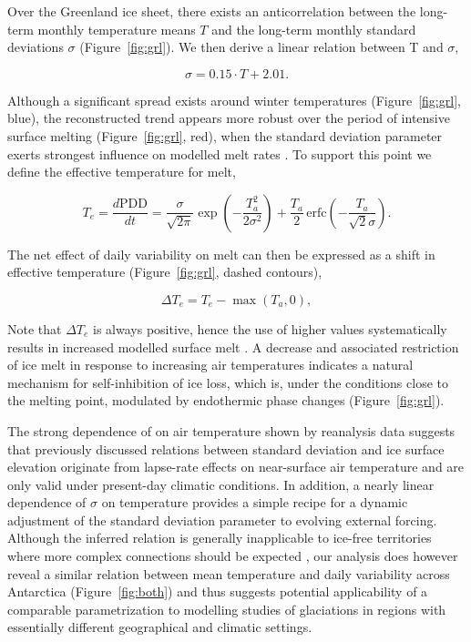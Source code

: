 \documentclass[review]{igs}
\begin{document}
Over the Greenland ice sheet, there exists an anticorrelation between the long-term monthly temperature means $T$ and the long-term monthly standard deviations $\sigma$ (Figure~\ref{fig:grl}). We then derive a linear relation between T and $\sigma$,

\begin{equation} \label{eq:sigma}
    \sigma = 0.15 \cdot T + 2.01.
\end{equation}

Although a significant spread exists around winter temperatures (Figure~\ref{fig:grl}, blue), the reconstructed trend appears more robust over the period of intensive surface melting (Figure~\ref{fig:grl}, red), when the standard deviation parameter exerts strongest influence on modelled melt rates \citep{rogozhina-rau-inpress}. To support this point we define the effective temperature for melt,

\begin{equation} \label{eq:teff}
    T_e = \frac{d\mathrm{PDD}}{dt}
        = \frac{\sigma}{\sqrt{2\pi}} \exp\left({-\frac{T_a^2}{2\sigma^2}}\right)
            + \frac{T_a}{2} \, \mathrm{erfc} \left(-\frac{T_a}{\sqrt{2}\sigma}\right).
\end{equation}

The net effect of daily variability on melt can then be expressed as a shift in effective temperature (Figure~\ref{fig:grl}, dashed contours),

\begin{equation} \label{eq:dteff}
    \Delta T_e = T_e - \max(T_a, 0),
\end{equation}

Note that $\Delta T_e$ is always positive, hence the use of higher values systematically results in increased modelled surface melt \citep{rogozhina-rau-inpress}. A decrease and associated restriction of ice melt in response to increasing air temperatures indicates a natural mechanism for self-inhibition of ice loss, which is, under the conditions close to the melting point, modulated by endothermic phase changes (Figure~\ref{fig:grl}).

The strong dependence of on air temperature shown by reanalysis data suggests that previously discussed relations between standard deviation and ice surface elevation \citep{fausto-etal-2009,fausto-etal-2011} originate from lapse-rate effects on near-surface air temperature and are only valid under present-day climatic conditions. In addition, a nearly linear dependence of $\sigma$ on temperature provides a simple recipe for a dynamic adjustment of the standard deviation parameter to evolving external forcing. Although the inferred relation is generally inapplicable to ice-free territories where more complex connections should be expected \citep{seguinot-2013}, our analysis does however reveal a similar relation between mean temperature and daily variability across Antarctica (Figure~\ref{fig:both}) and thus suggests potential applicability of a comparable parametrization to modelling studies of glaciations in regions with essentially different geographical and climatic settings.
\end{document}

